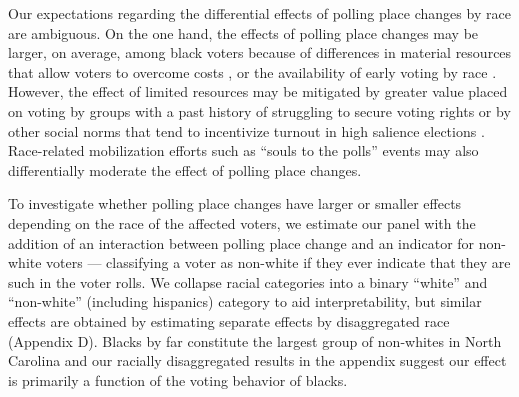 \documentclass{cup_PSRM}
\begin{document}
Our expectations regarding the differential effects of polling place changes by race are ambiguous. On the one hand, the effects of polling place changes may be larger, on average, among black voters because of differences in material resources that allow voters to overcome costs \citep{verba1995voice, wolfinger1980votes, leighley2013votes}, or the availability of early voting by race \citep{fullmer2015race}. However, the effect of limited resources may be mitigated by greater value placed on voting by groups with a past history of struggling to secure voting rights \citep{anollnorms} or by other social norms that tend to incentivize turnout in high salience elections \citep{doherty2017voting}.  Race-related mobilization efforts such as ``souls to the polls'' events may also differentially moderate the effect of polling place changes.

To investigate whether polling place changes have larger or smaller effects depending on the race of the affected voters, we estimate our panel with the addition of an interaction between polling place change and an indicator for non-white voters --- classifying a voter as non-white if they ever indicate that they are such in the voter rolls.  We collapse racial categories into a binary ``white'' and ``non-white'' (including hispanics) category to aid interpretability, but similar effects are obtained by estimating separate effects by disaggregated race (Appendix D).  Blacks by far constitute the largest group of non-whites in North Carolina and our racially disaggregated results in the appendix suggest our effect is primarily a function of the voting behavior of blacks.
\end{document}
